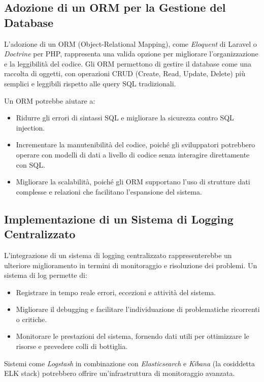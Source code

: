 \subsection{Adozione di un ORM per la Gestione del Database}

L’adozione di un ORM (Object-Relational Mapping), come \textit{Eloquent} di Laravel o \textit{Doctrine} per PHP, rappresenta una valida opzione per migliorare l’organizzazione e la leggibilità del codice. Gli ORM permettono di gestire il database come una raccolta di oggetti, con operazioni CRUD (Create, Read, Update, Delete) più semplici e leggibili rispetto alle query SQL tradizionali. 

Un ORM potrebbe aiutare a:
\begin{itemize}
    \item Ridurre gli errori di sintassi SQL e migliorare la sicurezza contro SQL injection.
    \item Incrementare la manutenibilità del codice, poiché gli sviluppatori potrebbero operare con modelli di dati a livello di codice senza interagire direttamente con SQL.
    \item Migliorare la scalabilità, poiché gli ORM supportano l’uso di strutture dati complesse e relazioni che facilitano l’espansione del sistema.
\end{itemize}

\subsection{Implementazione di un Sistema di Logging Centralizzato}

L'integrazione di un sistema di logging centralizzato rappresenterebbe un ulteriore miglioramento in termini di monitoraggio e risoluzione dei problemi. Un sistema di log permette di:
\begin{itemize}
    \item Registrare in tempo reale errori, eccezioni e attività del sistema.
    \item Migliorare il debugging e facilitare l’individuazione di problematiche ricorrenti o critiche.
    \item Monitorare le prestazioni del sistema, fornendo dati utili per ottimizzare le risorse e prevedere colli di bottiglia.
\end{itemize}

Sistemi come \textit{Logstash} in combinazione con \textit{Elasticsearch} e \textit{Kibana} (la cosiddetta ELK stack) potrebbero offrire un'infrastruttura di monitoraggio avanzata.

